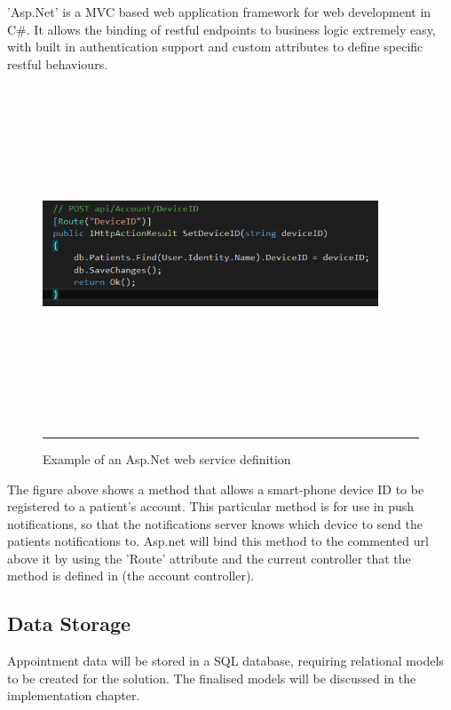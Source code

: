'Asp.Net' is a MVC based web application framework for web development in C\#. It allows the binding of restful endpoints to business logic extremely easy, with built in authentication support and custom attributes to define specific restful behaviours.

\begin{figure}[htbp]
	\centering
\includegraphics[width=10cm,height=10cm,keepaspectratio]{Figures/asp_example.png}
		\rule{35em}{0.5pt}
	\caption[Example of an Asp.Net web service definition]{Example of an Asp.Net web service definition}
	\label{fig:asp}
\end{figure}

The figure above shows a method that allows a smart-phone device ID to be registered to a patient's account. This particular method is for use in push notifications, so that the notifications server knows which device to send the patients notifications to. Asp.net will bind this method to the commented url above it by using the 'Route' attribute and the current controller that the method is defined in (the account controller).


\subsection{Data Storage}

Appointment data will be stored in a SQL database, requiring relational models to be created for the solution. The finalised models will be discussed in the implementation chapter.

